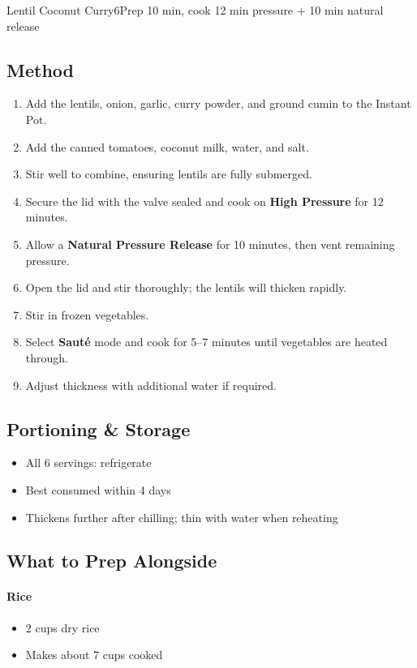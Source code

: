 \begin{recipebox}{Lentil Coconut Curry}{6}{Prep 10 min, cook 12 min pressure + 10 min natural release}
\subsection*{Method}
\begin{enumerate}
    \item Add the lentils, onion, garlic, curry powder, and ground cumin to the Instant Pot.
    \item Add the canned tomatoes, coconut milk, water, and salt.
    \item Stir well to combine, ensuring lentils are fully submerged.
    \item Secure the lid with the valve sealed and cook on \textbf{High Pressure} for 12 minutes.
    \item Allow a \textbf{Natural Pressure Release} for 10 minutes, then vent remaining pressure.
    \item Open the lid and stir thoroughly; the lentils will thicken rapidly.
    \item Stir in frozen vegetables.
    \item Select \textbf{Sauté} mode and cook for 5--7 minutes until vegetables are heated through.
    \item Adjust thickness with additional water if required.
\end{enumerate}

\subsection*{Portioning \& Storage}
\begin{itemize}
    \item All 6 servings: refrigerate
    \item Best consumed within 4 days
    \item Thickens further after chilling; thin with water when reheating
\end{itemize}

\subsection*{What to Prep Alongside}

\paragraph{Rice}
\begin{itemize}
    \item 2 cups dry rice
    \item Makes about 7 cups cooked
\end{itemize}


\end{recipebox}
